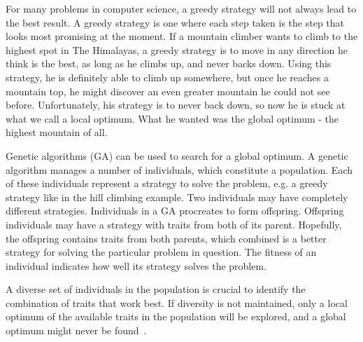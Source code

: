 For many problems in computer science, a greedy strategy will not always lead to the best result.
A greedy strategy is one where each step taken is the step that looks most promising at the moment.
If a mountain climber wants to climb to the highest spot in The Himalayas, a greedy strategy is to move in any direction he think is the best, as long as he climbs up, and never backs down.
Using this strategy, he is definitely able to climb up somewhere, but once he reaches a mountain top, he might discover an even greater mountain he could not see before. Unfortunately, his strategy is to never back down, so now he is stuck at what we call a local optimum. What he wanted was the global optimum - the highest mountain of all.
 
Genetic algorithms (GA) can be used to search for a global optimum. A genetic algorithm manages a number of individuals, which constitute a population. Each of these individuals represent a strategy to solve the problem, e.g. a greedy strategy like in the hill climbing example. Two individuals may have completely different strategies. 
Individuals in a GA procreates to form offspring. Offspring individuals may have a strategy with traits from both of its parent.
Hopefully, the offspring contains traits from both parents, which combined is a better strategy for solving the particular problem in question. The fitness of an individual indicates how well its strategy solves the problem.

A diverse set of individuals in the population is crucial to identify the combination of traits that work best. 
If diversity is not maintained, only a local optimum of the available traits in the population will be explored, and a global optimum might never be found~\cite{ursem2002diversity}.



